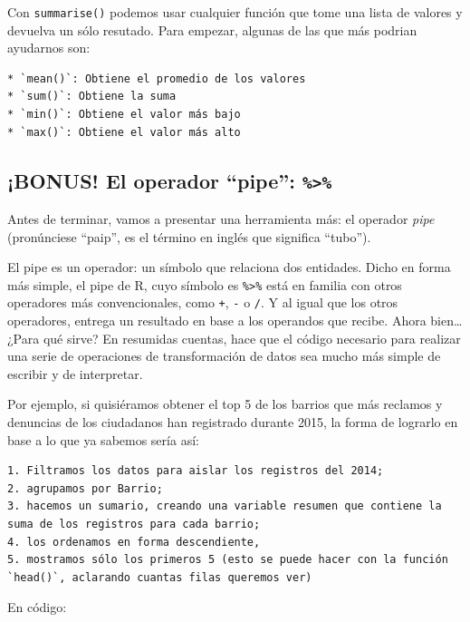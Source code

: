 \documentclass[spanish,]{book}
\begin{document}
Con \texttt{summarise()} podemos usar cualquier función que tome una lista de valores y devuelva un sólo resutado. Para empezar, algunas de las que más podrian ayudarnos son:

\begin{verbatim}
* `mean()`: Obtiene el promedio de los valores
* `sum()`: Obtiene la suma
* `min()`: Obtiene el valor más bajo
* `max()`: Obtiene el valor más alto
\end{verbatim}

\hypertarget{bonus-el-operador-pipe}{%
\subsection{\texorpdfstring{¡BONUS! El operador ``pipe'': \texttt{\%\textgreater{}\%}}{¡BONUS! El operador ``pipe'': \%\textgreater{}\%}}\label{bonus-el-operador-pipe}}

Antes de terminar, vamos a presentar una herramienta más: el operador \emph{pipe} (pronúnciese ``paip'', es el término en inglés que significa ``tubo'').

El pipe es un operador: un símbolo que relaciona dos entidades. Dicho en forma más simple, el pipe de R, cuyo símbolo es \texttt{\%\textgreater{}\%} está en familia con otros operadores más convencionales, como \texttt{+}, \texttt{-} o \texttt{/}. Y al igual que los otros operadores, entrega un resultado en base a los operandos que recibe. Ahora bien\ldots{} ¿Para qué sirve? En resumidas cuentas, hace que el código necesario para realizar una serie de operaciones de transformación de datos sea mucho más simple de escribir y de interpretar.

Por ejemplo, si quisiéramos obtener el top 5 de los barrios que más reclamos y denuncias de los ciudadanos han registrado durante 2015, la forma de lograrlo en base a lo que ya sabemos sería así:

\begin{verbatim}
1. Filtramos los datos para aislar los registros del 2014;
2. agrupamos por Barrio;
3. hacemos un sumario, creando una variable resumen que contiene la suma de los registros para cada barrio;
4. los ordenamos en forma descendiente,
5. mostramos sólo los primeros 5 (esto se puede hacer con la función `head()`, aclarando cuantas filas queremos ver)
\end{verbatim}

En código:
\end{document}
